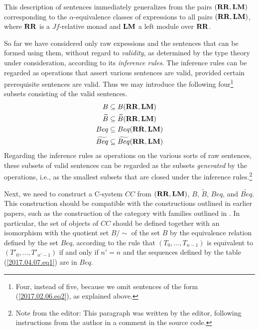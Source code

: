 \documentclass[12pt]{amsart}
\numberwithin{proposition}{subsection}
\newcommand{\wt}{\widetilde}
\newcommand{\RR}{{\bf RR}}
\newcommand{\LM}{{\bf LM}}
\newcommand{\editorfootnote}[1]{\footnote{Note from the editor: #1}}
\begin{document}
This description of sentences immediately generalizes from the pairs
$(\RR,\LM)$ corresponding to the $\alpha$-equivalence classes of expressions to
all pairs $(\RR,\LM)$, where $\RR$ is a $Jf$-relative monad and $\LM$ a left
module over $\RR$.



So far we have considered only raw expessions and the sentences that can be
formed using them, without regard to {\em validity}, as determined by the type
theory under consideration, according to its {\em inference rules}.  The
inference rules can be regarded as operations that assert various sentences are
valid, provided certain prerequisite sentences are valid.  Thus we may introduce
the following four\footnote{Four, instead of five, because we omit sentences of 
the form (\ref{2017.02.06.eq2}), as explained above.}
subsets consisting of the valid sentences.
\begin{equation*}
  \begin{split}
    B        & \subseteq B(\RR,\LM) \\
    \wt{B}   & \subseteq \wt{B}(\RR,\LM) \\
    Beq      & \subseteq Beq(\RR,\LM) \\
    \wt{Beq} & \subseteq \wt{Beq}(\RR,\LM)
  \end{split}
\end{equation*}
Regarding the inference rules as operations on the various sorts of raw
sentences, these subsets of valid sentences can be regarded as the subsets {\em
  generated} by the operations, i.e., as the smallest subsets that are closed
under the inference rules.\editorfootnote{This paragraph was written by the
  editor, following instructions from the author in a comment in the source code.}


Next, we need to construct a C-system $CC$ from $(\RR,\LM)$, $B$, $\wt{B}$, $Beq$, and
$\wt{Beq}$.  This construction should be compatible with the
constructions outlined in earlier papers, such as the construction of the
category with families outlined in \cite{Hofmann}. In particular, the set of
objects of $CC$ should be defined together with an isomorphism with the quotient
set $B/{\sim}$ of the set $B$ by the equivalence relation defined by the set
$Beq$, according to the rule that $(T_0,\dots,T_{n-1})$ is equivalent to
$(T'_0,\dots,T'_{n'-1})$ if and only if $n'=n$ and the sequences defined by the
table (\ref{2017.04.07.eq1}) are in $Beq$.
\end{document}

